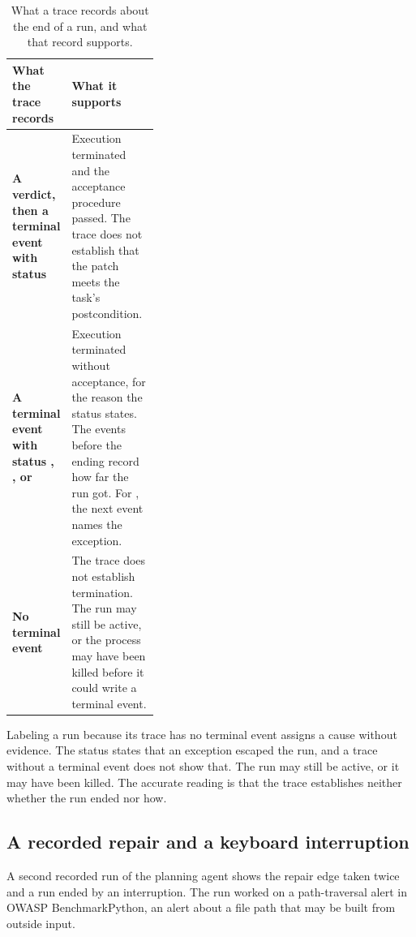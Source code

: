 \begin{table}[htbp]
  \caption{What a trace records about the end of a run, and what that record supports.}
  \label{tab:routing-trace}
  \begin{adjustbox}{width=\linewidth}\begin{tabularx}{\linewidth}{L{0.36\linewidth}X}
    \toprule
    \textbf{What the trace records} & \textbf{What it supports} \\
    \midrule
    \textbf{A verdict, then a terminal event with status } & Execution terminated
    and the acceptance procedure passed. The trace does not establish that the patch meets the
    task's postcondition. \\
    \addlinespace
    \textbf{A terminal event with status , ,
     or } & Execution terminated without acceptance, for the
    reason the status states. The events before the ending record how far the run got. For
    , the next event names the exception. \\
    \addlinespace
    \textbf{No terminal event} & The trace does not establish termination. The run may still be
    active, or the process may have been killed before it could write a terminal event. \\
    \bottomrule
  \end{tabularx}\end{adjustbox}
\end{table}

Labeling a run  because its trace has no terminal event assigns a cause without
evidence. The status  states that an exception escaped the run, and a trace without a
terminal event does not show that. The run may still be active, or it may have been killed. The
accurate reading is that the trace establishes neither whether the run ended nor how.

\subsection{A recorded repair and a keyboard interruption}
\label{sec:routing-recorded}

A second recorded run of the planning agent shows the repair edge taken twice and a run ended by an
interruption. The run worked on a path-traversal alert in OWASP BenchmarkPython, an alert about a
file path that may be built from outside input.

